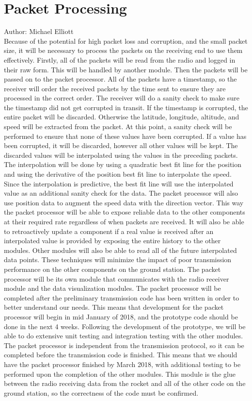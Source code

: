 \documentclass[onecolumn, draftclsnofoot,10pt, compsoc]{IEEEtran}
\begin{document}
\section{Packet Processing}
Author: Michael Elliott\\
Because of the potential for high packet loss and corruption, and the
small packet size, it will be necessary to process the packets on the
receiving end to use them effectively.
Firstly, all of the packets will be read from the radio and logged in
their raw form.
This will be handled by another module.
Then the packets will be passed on to the packet processor.
All of the packets have a timestamp, so the receiver will order the
received packets by the time sent to ensure they are processed in the
correct order.
The receiver will do a sanity check to make sure the timestamp did not
get corrupted in transit.
If the timestamp is corrupted, the entire packet will be discarded.
Otherwise the latitude, longitude, altitude, and speed will be
extracted from the packet.
At this point, a sanity check will be performed to ensure that none of
these values have been corrupted.
If a value has been corrupted, it will be discarded, however all other
values will be kept.
The discarded values will be interpolated using the values in the
preceding packets.
The interpolation will be done by using a quadratic best fit line for
the position and using the derivative of the position best fit line to
interpolate the speed.
Since the interpolation is predictive, the best fit line will use the
interpolated value as an additional sanity check for the data.
The packet processor will also use position data to augment the speed
data with the direction vector.
This way the packet processor will be able to expose reliable data to
the other components at their required rate regardless of when packets
are received.
It will also be able to retroactively update a component if a real
value is received after an interpolated value is provided by exposing
the entire history to the other modules.
Other modules will also be able to read all of the future interpolated
data points.
These techniques will minimize the impact of poor transmission
performance on the other components on the ground station.
The packet processor will be its own module that communicates with the
radio receiver module and the data visualization modules.
The packet processor will be completed after the preliminary
transmission code has been written in order to better understand our
needs.
This means that development for the packet processor will begin in mid
January of 2018, and the prototype code should be done in the next 4
weeks.
Following the development of the prototype, we will be able to do
extensive unit testing and integration testing with the other modules.
The packet processor is independent from the transmission protocol, so
it can be completed before the transmission code is finished.
This means that we should have the packet processor finished by March
2018, with additional testing to be performed upon the completion of
the other modules.
This module is the glue between the radio receiving data from the
rocket and all of the other code on the ground station, so the
correctness of the code must be confirmed.
\end{document}

